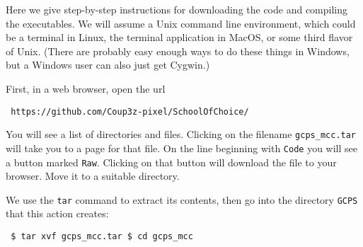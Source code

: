 \documentclass[12pt]{article}
\theoremstyle{definition}
\begin{document}
Here we give step-by-step instructions for downloading the code and
compiling the executables.  We will assume a Unix command line
environment, which could be a terminal in Linux, the terminal
application in MacOS, or some third flavor of Unix.  (There are
probably easy enough ways to do these things in Windows, but a Windows
user can also just get Cygwin.)

First, in a web browser, open the url
\begin{obeylines}
  \texttt{
    https://github.com/Coup3z-pixel/SchoolOfChoice/
    }
\end{obeylines}

\bigskip \noindent You will see a list of directories and files.
Clicking on the filename \texttt{gcps\_mcc.tar} will take you to a
page for that file.  On the line beginning with \texttt{Code} you will
see a button marked \texttt{Raw}.  Clicking on that button will
download the file to your browser.  Move it to a suitable directory.

We use the \texttt{tar} command to
extract its contents, then go into the directory \texttt{GCPS} that this action creates:
\begin{obeylines}
  \texttt{
    \$ tar xvf gcps\_mcc.tar
    \$ cd gcps\_mcc
    }
\end{obeylines}
\bigskip
\end{document}
